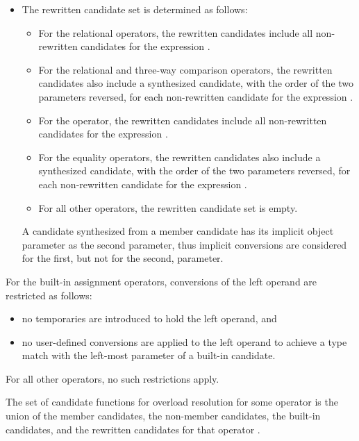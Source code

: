 \begin{itemize}
\item
The rewritten candidate set is determined as follows:
\begin{itemize}
\item
For the relational operators,
the rewritten candidates include
all non-rewritten candidates
for the expression .
\item
For the
relational and
three-way comparison
operators,
the rewritten candidates also include
a synthesized candidate,
with the order of the two parameters reversed,
for each non-rewritten candidate
for the expression
.
\item
For the \tcode{!=} operator,
the rewritten candidates
include all non-rewritten candidates
for the expression .
\item
For the equality operators,
the rewritten candidates also include a synthesized candidate,
with the order of the two parameters reversed,
for each non-rewritten candidate
for the expression .
\item
For all other operators, the rewritten candidate set is empty.
\end{itemize}
\begin{note}
A candidate synthesized from a member candidate has its implicit
object parameter as the second parameter, thus implicit conversions
are considered for the first, but not for the second, parameter.
\end{note}
\end{itemize}

\pnum
For the built-in assignment operators, conversions of the left
operand are restricted as follows:

\begin{itemize}
\item
no temporaries are introduced to hold the left operand, and
\item
no user-defined conversions are applied to the left operand to achieve
a type match with the left-most parameter of a built-in candidate.
\end{itemize}

\pnum
For all other operators, no such restrictions apply.

\pnum
The set of candidate functions for overload resolution
for some operator 
is the
union of
the member candidates,
the non-member candidates,
the built-in candidates,
and the rewritten candidates
for that operator .

